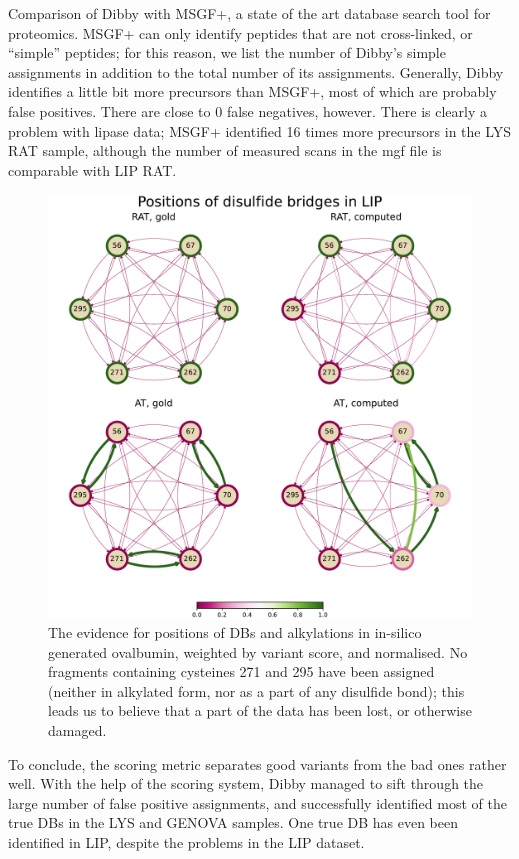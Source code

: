 \begin{table}[]
  \caption{Comparison of Dibby with MSGF+, a state of the art database search tool for proteomics. MSGF+ can only identify peptides that are not cross-linked, or ``simple'' peptides; for this reason, we list the number of Dibby's simple assignments in addition to the total number of its assignments. Generally, Dibby identifies a little bit more precursors than MSGF+, most of which are probably false positives. There are close to 0 false negatives, however. There is clearly a problem with lipase data; MSGF+ identified 16 times more precursors in the LYS RAT sample, although the number of measured scans in the mgf file is comparable with LIP RAT.}\label{tbl:measurements}
\end{table}

\begin{figure}
  \centering
  \includegraphics[width=1\linewidth]{img/lip.pdf}
  \caption{The evidence for positions of DBs and alkylations in in-silico generated ovalbumin, weighted by variant score, and normalised. No fragments containing cysteines 271 and 295 have been assigned (neither in alkylated form, nor as a part of any disulfide bond); this leads us to believe that a part of the data has been lost, or otherwise damaged.}\label{fig:lip}
\end{figure}

To conclude, the scoring metric separates good variants from the bad ones rather well. With the help of the scoring system, Dibby managed to sift through the large number of false positive assignments, and successfully identified most of the true DBs in the LYS and GENOVA samples. One true DB has even been identified in LIP, despite the problems in the LIP dataset.


